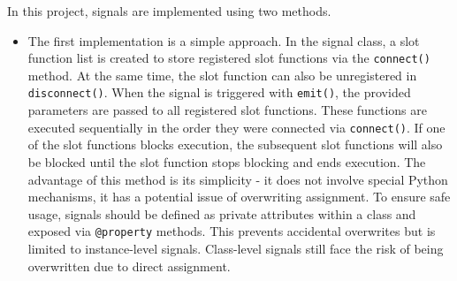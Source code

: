 \documentclass[
english,
ruledheaders=section,%
class=report,%
thesis={type=Report},%
accentcolor=9c,%
custommargins=true,%
marginpar=false,%
parskip=half-,%
fontsize=11pt,%
logofile={img/tuda_logo.pdf}, %
]{tudapub}
\begin{document}
    In this project, signals are implemented using two methods.
    \begin{itemize}

        \item The first implementation is a simple approach. In the signal class, a slot function list is created to store registered slot functions via the \texttt{connect()} method. At the same time, the slot function can also be unregistered in \texttt{disconnect()}. When the signal is triggered with \texttt{emit()}, the provided parameters are passed to all registered slot functions. These functions are executed sequentially in the order they were connected via \texttt{connect()}. If one of the slot functions blocks execution, the subsequent slot functions will also be blocked until the slot function stops blocking and ends execution. The advantage of this method is its simplicity - it does not involve special Python mechanisms, it has a potential issue of overwriting assignment. To ensure safe usage, signals should be defined as private attributes within a class and exposed via \texttt{@property} methods. This prevents accidental overwrites but is limited to instance-level signals. Class-level signals still face the risk of being overwritten due to direct assignment.



\end{itemize}
\end{document}
